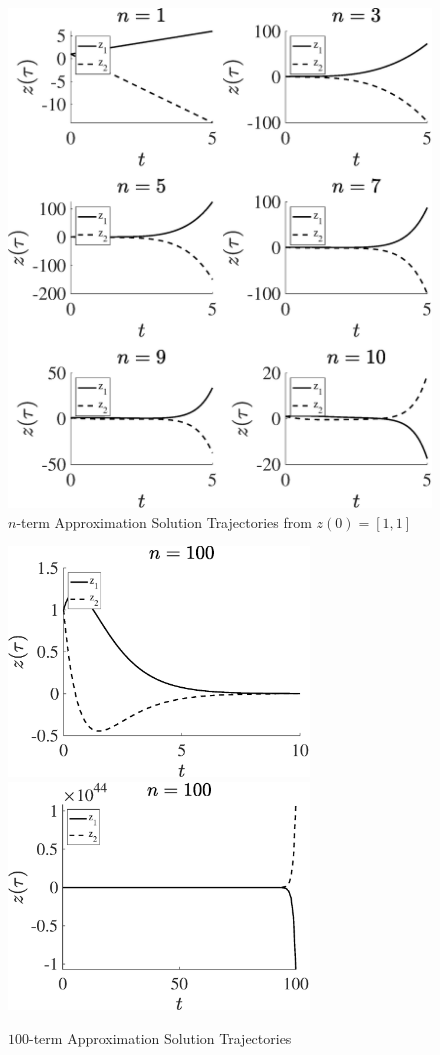 \documentclass[11pt]{article}
\begin{document}
\begin{figure}[h]
\includegraphics[width=15cm]{n_approx_trajs.eps}
\caption{$n$-term Approximation Solution Trajectories from $z(0) = [1, 1]$}
\label{fig}
\end{figure}

\begin{figure}[h]
\centering
\includegraphics[width=8cm]{Approx_traj_100_term.eps}
\includegraphics[width=8cm]{Approx_traj_100_term2.eps}
\caption{$100$-term Approximation Solution Trajectories}
\label{fig2}
\end{figure}
\clearpage 
\end{document}
